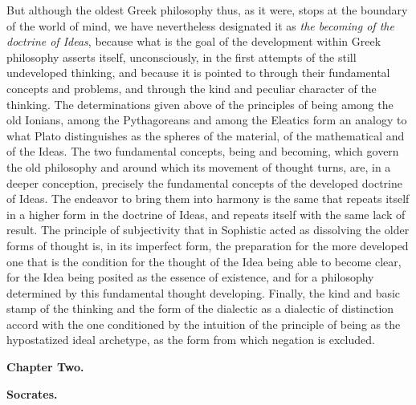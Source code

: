 But although the oldest Greek philosophy thus, as it were, stops at the
boundary of the world of mind, we have nevertheless designated it as
\emph{the becoming of the doctrine of Ideas}, because what is the goal of the
development within Greek philosophy asserts itself, unconsciously, in the
first attempts of the still undeveloped thinking, and because it is pointed
to through their fundamental concepts and problems, and through the kind and
peculiar character of the thinking. The determinations given above of the
principles of being among the old Ionians, among the Pythagoreans and among
the Eleatics form an analogy to what Plato distinguishes as the spheres of
the material, of the mathematical and of the Ideas.
The two fundamental concepts, being and becoming, which govern the
old philosophy and around which its movement of thought turns, are, in a
deeper conception, precisely the fundamental concepts of the developed
doctrine of Ideas. The endeavor to bring them into harmony is the same that
repeats itself in a higher form in the doctrine of Ideas, and repeats itself
with the same lack of result. The principle of subjectivity that in Sophistic
acted as dissolving the older forms of thought is, in its imperfect form, the
preparation for the more developed one that is the condition for the thought
of the Idea being able to become clear, for the Idea being posited as the
essence of existence, and for a philosophy determined by this fundamental
thought developing. Finally, the kind and basic stamp of the thinking and the
form of the dialectic as a dialectic of distinction accord with the one
conditioned by the intuition of the principle of being as the hypostatized
ideal archetype, as the form from which negation is excluded.

\divrule

\begin{center}
{\Large\textbf{Chapter Two.}}
\end{center}

\divrule

\begin{center}
\textbf{Socrates.}
\end{center}

